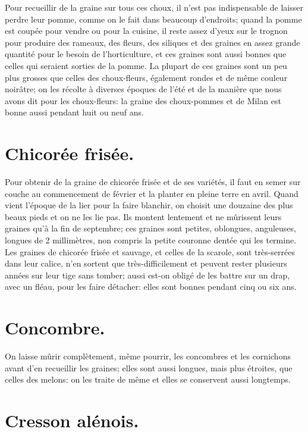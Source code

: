 \documentclass[10pt,a4paper]{book}
\begin{document}
Pour recueillir de la graine sur tous ces choux, il n'est pas indispensable de laisser perdre leur pomme, comme on le fait dans beaucoup d'endroits; quand la pomme est coupée pour vendre ou pour la cuisine, il reste assez d'yeux sur le trognon pour produire des rameaux, des fleurs, des siliques et des graines en assez grande quantité pour le besoin de l'horticulture, et ces graines sont aussi bonnes que celles qui seraient sorties de la pomme. La plupart de ces graines sont un peu plus grosses que celles des choux-fleurs, également rondes et de même couleur noirâtre; on les récolte à diverses époques de l'été et de la manière que nous avons dit pour les choux-fleurs: la graine des choux-pommes et de Milan est bonne aussi pendant huit ou neuf ans.

\section{Chicorée frisée.}

Pour obtenir de la graine de chicorée frisée et de ses variétés, il faut en semer sur couche au commencement de février et la planter en pleine terre en avril. Quand vient l'époque de la lier pour la faire blanchir, on choisit une douzaine des plus beaux pieds et on ne les lie pas. Ils montent lentement et ne mûrissent leurs graines qu'à la fin de septembre; ces graines sont petites, oblongues, anguleuses, longues de 2 millimètres, non compris la petite couronne dentée qui les termine. Les graines de chicorée frisée et sauvage, et celles de la scarole, sont très-serrées dans leur calice, n'en sortent que très-difficilement et peuvent rester plusieurs années sur leur tige sans tomber; aussi est-on obligé de les battre sur un drap, avec un fléau, pour les faire détacher: elles sont bonnes pendant cinq ou six ans.

\section{Concombre.}

On laisse mûrir complètement, même pourrir, les concombres et les cornichons avant d'en recueillir les graines; elles sont aussi longues, mais plus étroites, que celles des melons: on les traite de même et elles se conservent aussi longtemps.

\section{Cresson alénois.}
\end{document}
